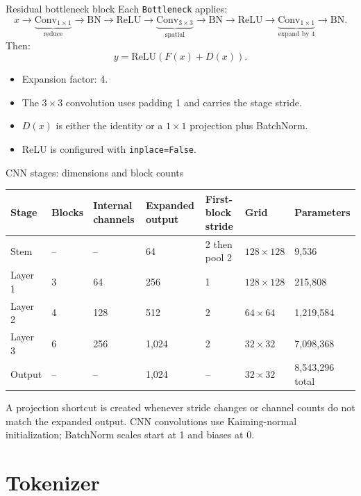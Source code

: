 \documentclass[aspectratio=169,10pt]{beamer}
\newcommand{\code}[1]{\texttt{#1}}
\begin{document}
\begin{frame}{Residual bottleneck block}
  Each \code{Bottleneck} applies:
  \[
    x \rightarrow
    \underbrace{\mathrm{Conv}_{1\times1}}_{\text{reduce}}
    \rightarrow \mathrm{BN}\rightarrow\mathrm{ReLU}
    \rightarrow
    \underbrace{\mathrm{Conv}_{3\times3}}_{\text{spatial}}
    \rightarrow \mathrm{BN}\rightarrow\mathrm{ReLU}
    \rightarrow
    \underbrace{\mathrm{Conv}_{1\times1}}_{\text{expand by 4}}
    \rightarrow \mathrm{BN}.
  \]
  Then:
  \[
    y = \mathrm{ReLU}(F(x) + D(x)).
  \]
  \begin{itemize}
    \item Expansion factor: 4.
    \item The $3\times3$ convolution uses padding 1 and carries the stage stride.
    \item $D(x)$ is either the identity or a $1\times1$ projection plus BatchNorm.
    \item ReLU is configured with \code{inplace=False}.
  \end{itemize}
\end{frame}

\begin{frame}{CNN stages: dimensions and block counts}
  \centering
  \scriptsize
  \begin{tabular}{lllllll}
    \toprule
    Stage & Blocks & Internal channels & Expanded output & First-block stride & Grid & Parameters\\
    \midrule
    Stem & -- & -- & 64 & 2 then pool 2 & $128\times128$ & 9,536\\
    Layer 1 & 3 & 64 & 256 & 1 & $128\times128$ & 215,808\\
    Layer 2 & 4 & 128 & 512 & 2 & $64\times64$ & 1,219,584\\
    Layer 3 & 6 & 256 & 1,024 & 2 & $32\times32$ & 7,098,368\\
    \midrule
    Output & -- & -- & 1,024 & -- & $32\times32$ & 8,543,296 total\\
    \bottomrule
  \end{tabular}
  \vspace{0.7em}
  A projection shortcut is created whenever stride changes or channel counts do
  not match the expanded output. CNN convolutions use Kaiming-normal
  initialization; BatchNorm scales start at 1 and biases at 0.
\end{frame}

\section{Tokenizer}
\end{document}

